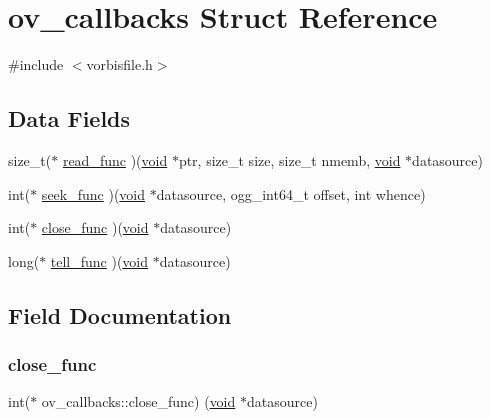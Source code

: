 \hypertarget{structov__callbacks}{}\section{ov\+\_\+callbacks Struct Reference}
\label{structov__callbacks}


{\ttfamily \#include $<$vorbisfile.\+h$>$}

\subsection*{Data Fields}
\begin{DoxyCompactItemize}
\item 
size\+\_\+t($\ast$ \hyperlink{structov__callbacks_a301b93b9f0436e5bde6dbdeb0edeae77}{read\+\_\+func} )(\hyperlink{png_8h_ac9c84fa68bbad002983e35ce3663c686}{void} $\ast$ptr, size\+\_\+t size, size\+\_\+t nmemb, \hyperlink{png_8h_ac9c84fa68bbad002983e35ce3663c686}{void} $\ast$datasource)
\item 
int($\ast$ \hyperlink{structov__callbacks_aa49d8079756c1c26e2ba9b974e463dfa}{seek\+\_\+func} )(\hyperlink{png_8h_ac9c84fa68bbad002983e35ce3663c686}{void} $\ast$datasource, ogg\+\_\+int64\+\_\+t offset, int whence)
\item 
int($\ast$ \hyperlink{structov__callbacks_a4d1141e00251a23b27e1de261e8717ec}{close\+\_\+func} )(\hyperlink{png_8h_ac9c84fa68bbad002983e35ce3663c686}{void} $\ast$datasource)
\item 
long($\ast$ \hyperlink{structov__callbacks_ab078f3f386b7c58e9fab2ede904e0e36}{tell\+\_\+func} )(\hyperlink{png_8h_ac9c84fa68bbad002983e35ce3663c686}{void} $\ast$datasource)
\end{DoxyCompactItemize}


\subsection{Field Documentation}
\mbox{\label{structov__callbacks_a4d1141e00251a23b27e1de261e8717ec}} 
\subsubsection{\texorpdfstring{close\+\_\+func}{close\_func}}
{\footnotesize\ttfamily int($\ast$ ov\+\_\+callbacks\+::close\+\_\+func) (\hyperlink{png_8h_ac9c84fa68bbad002983e35ce3663c686}{void} $\ast$datasource)}

